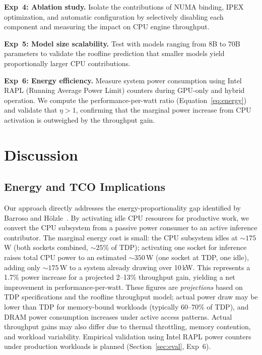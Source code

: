 \documentclass[10pt,conference]{IEEEtran}
\begin{document}
\textbf{Exp~4: Ablation study.}
Isolate the contributions of NUMA binding, IPEX optimization, and automatic configuration by selectively disabling each component and measuring the impact on CPU engine throughput.

\textbf{Exp~5: Model size scalability.}
Test with models ranging from 8B to 70B parameters to validate the roofline prediction that smaller models yield proportionally larger CPU contributions.

\textbf{Exp~6: Energy efficiency.}
Measure system power consumption using Intel RAPL (Running Average Power Limit) counters during GPU-only and hybrid operation.
We compute the performance-per-watt ratio (Equation~\ref{eq:energy}) and validate that $\eta > 1$, confirming that the marginal power increase from CPU activation is outweighed by the throughput gain.

\section{Discussion}
\label{sec:discussion}

\subsection{Energy and TCO Implications}

Our approach directly addresses the energy-proportionality gap identified by Barroso and H\"{o}lzle~\cite{barroso2007energy}.
By activating idle CPU resources for productive work, we convert the CPU subsystem from a passive power consumer to an active inference contributor.
The marginal energy cost is small: the CPU subsystem idles at ${\sim}175$\,W (both sockets combined, ${\sim}25\%$ of TDP); activating one socket for inference raises total CPU power to an estimated ${\sim}350$\,W (one socket at TDP, one idle), adding only ${\sim}175$\,W to a system already drawing over 10\,kW.
This represents a 1.7\% power increase for a projected 2--13\% throughput gain, yielding a net improvement in performance-per-watt.
These figures are \emph{projections} based on TDP specifications and the roofline throughput model; actual power draw may be lower than TDP for memory-bound workloads (typically 60--70\% of TDP), and DRAM power consumption increases under active access patterns.
Actual throughput gains may also differ due to thermal throttling, memory contention, and workload variability.
Empirical validation using Intel RAPL power counters under production workloads is planned (Section~\ref{sec:eval}, Exp~6).
\end{document}
